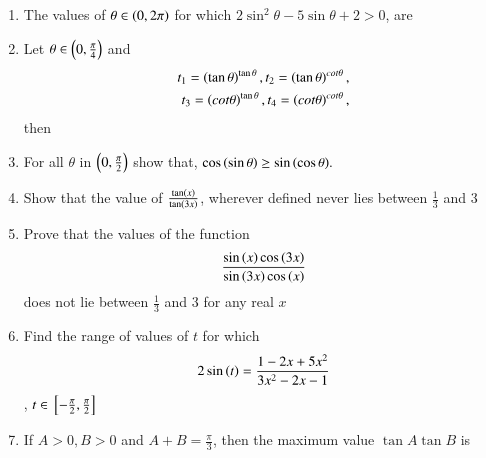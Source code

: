 \begin{enumerate}[label=\thesubsection.\arabic*,ref=\thesubsection.\theenumi]
\item The values of $\theta \in \left(0,2\pi\right)$ for which $2\sin^2\theta - 5\sin\theta + 2 > 0$, are
\hfill{}
\begin{enumerate}
\end{enumerate}
\item Let $\theta \in \left(0,\frac{\pi}{4}\right)$ and 
\begin{align*}
t_1 = \left(\tan\theta\right)^{\tan\theta}, t_2 = \left(\tan\theta\right)^{cot\theta},\\t_3 = \left(cot\theta\right)^{\tan\theta}, t_4 = \left(cot\theta\right)^{cot\theta},
\end{align*} then
\hfill{}
\begin{enumerate}
\end{enumerate}
\item For all $\theta$ in $\left(0, \frac{\pi}{2}\right)$ show that, $\cos\left(\sin\theta\right)\geq
\sin{\ensuremath{\left(\cos{\theta}\right)}}.$ \hfill{}
\item Show that the value of  $\frac{\tan \left(x\right)}{\tan \left(3x\right)}$, wherever defined never lies between $\frac{1}{3}$ and $3$
\hfill{}
\item Prove that the values of the function 
$$
\frac{\sin \left(x\right) \cos \left(3x\right)}{\sin \left(3x\right) \cos \left(x\right)}
$$
does not lie between $\frac{1}{3}$ and $3$ for any real $x$\\
\hfill{}
\item Find the range of values of $t$ for which 
$$
2\sin \left(t\right) = \frac{1-2x+5x^2}{3x^2-2x-1}
$$
, $t \in {}\left[-\frac{\pi}{2},\frac{\pi}{2}\right]$
\hfill{}
    \item If $A > 0, B>0$ and $A + B = \frac{\pi}{3}$, then the maximum value $\tan A \tan B$ is  
        \hfill{}


\end{enumerate}
